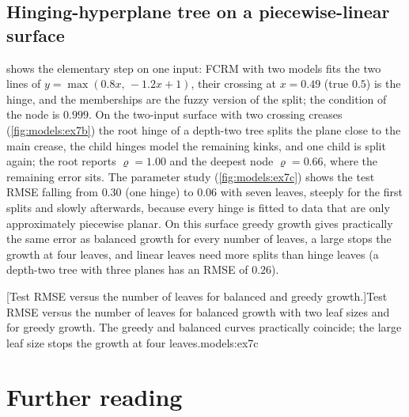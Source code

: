 \subsection{Hinging-hyperplane tree on a piecewise-linear surface}

 shows the elementary step on one input: FCRM with two models fits the two lines of $y=\max(0.8x,\,-1.2x+1)$, their crossing at $x=0.49$ (true $0.5$) is the hinge, and the memberships are the fuzzy version of the split; the condition of the node is $0.999$. On the two-input surface with two crossing creases (\cref{fig:models:ex7b}) the root hinge of a depth-two tree splits the plane close to the main crease, the child hinges model the remaining kinks, and one child is split again; the root reports $\varrho=1.00$ and the deepest node $\varrho=0.66$, where the remaining error sits. The parameter study (\cref{fig:models:ex7c}) shows the test RMSE falling from $0.30$ (one hinge) to $0.06$ with seven leaves, steeply for the first splits and slowly afterwards, because every hinge is fitted to data that are only approximately piecewise planar. On this surface greedy growth gives practically the same error as balanced growth for every number of leaves, a large  stops the growth at four leaves, and linear leaves need more splits than hinge leaves (a depth-two tree with three planes has an RMSE of $0.26$).

[Test RMSE versus the number of leaves for balanced and greedy growth.]{Test RMSE versus the number of leaves for balanced growth with two leaf sizes and for greedy growth. The greedy and balanced curves practically coincide; the large leaf size stops the growth at four leaves.}{models:ex7c}

\section{Further reading}\label{sec:models:reading}

